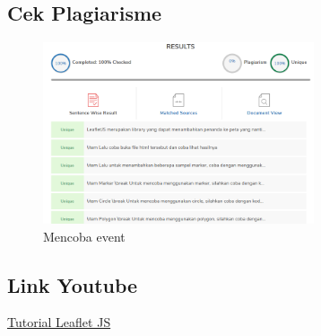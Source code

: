 \subsection{Cek Plagiarisme}
\hfill\break
\begin{figure}[H]
    \includegraphics[width=8cm]{figures/1174035/tugas5/plagiarism.png}
    \centering
    \caption{Mencoba event}
\end{figure}
\subsection{Link Youtube}
\href{https://youtu.be/pUeH1U6jcs4}{Tutorial Leaflet JS}